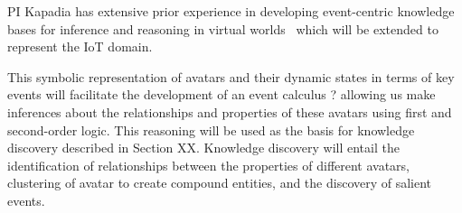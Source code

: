 PI Kapadia has extensive prior experience in developing event-centric knowledge bases for inference and reasoning in virtual worlds~\cite{Shoulson:2013:EPA:2522628.2522629,2015-fdg-bstl,Kapadia:2015:CAI:2699276.2699279,Kapadia:2016:CCN:2982818.2982846} which will be extended to represent the IoT domain.











This symbolic representation of avatars and their dynamic states in terms of key events will facilitate the development of an event calculus ? allowing us make inferences about the relationships and properties of these avatars using first and second-order logic. This reasoning will be used as the basis for knowledge discovery described in Section XX. Knowledge discovery will entail the identification of relationships between the properties of different avatars, clustering of avatar to create compound entities, and the discovery of salient events.


